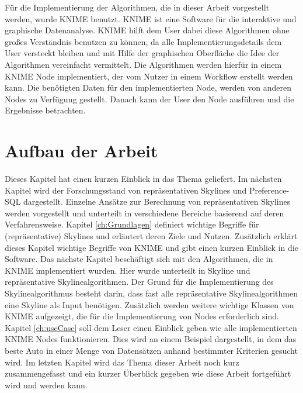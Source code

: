 Für die Implementierung der Algorithmen, die in dieser Arbeit vorgestellt werden, wurde KNIME benutzt. KNIME ist eine Software für die interaktive und graphische Datenanalyse. KNIME hilft dem User dabei diese Algorithmen ohne großes Verständnis benutzen zu können, da alle Implementierungsdetails dem User versteckt bleiben und mit Hilfe der graphischen Oberfläche die Idee der Algorithmen vereinfacht vermittelt. Die Algorithmen werden hierfür in einem KNIME Node implementiert, der vom Nutzer in einem Workflow erstellt werden kann. Die benötigten Daten für den implementierten Node, werden von anderen Nodes zu Verfügung gestellt. Danach kann der User den Node ausführen und die Ergebnisse betrachten. 
\section{Aufbau der Arbeit}
\label{ch:Einleitung:sec:Gliederung}
Dieses Kapitel hat einen kurzen Einblick in das Thema geliefert. Im nächsten Kapitel wird der Forschungsstand von repräsentativen Skylines und Preference-SQL dargestellt. Einzelne Ansätze zur Berechnung von repräsentativen Skylines werden vorgestellt und unterteilt in verschiedene Bereiche basierend auf deren Verfahrensweise. 
Kapitel \ref{ch:Grundlagen} definiert wichtige Begriffe für (repräsentative) Skylines und erläutert deren Ziele und Nutzen. Zusätzlich erklärt dieses Kapitel wichtige Begriffe von KNIME und gibt einen kurzen Einblick in die Software.
Das nächste Kapitel beschäftigt sich mit den Algorithmen, die in KNIME implementiert wurden. Hier wurde unterteilt in Skyline und repräsentative Skylinealgorithmen. Der Grund für die Implementierung des Skylinealgorithmus besteht darin, dass fast alle repräsentative Skylinealgorithmen eine Skyline als Input benötigen. Zusätzlich werden weitere wichtige Klassen von KNIME aufgezeigt, die für die Implementierung von Nodes erforderlich sind.
Kapitel \ref{ch:useCase} soll dem Leser einen Einblick geben wie alle implementierten KNIME Nodes funktionieren. Dies wird an einem Beispiel dargestellt, in dem das beste Auto in einer Menge von Datensätzen anhand bestimmter Kriterien gesucht wird. Im letzten Kapitel wird das Thema dieser Arbeit noch kurz zusammengefasst und ein kurzer Überblick gegeben wie diese Arbeit fortgeführt wird und werden kann.
